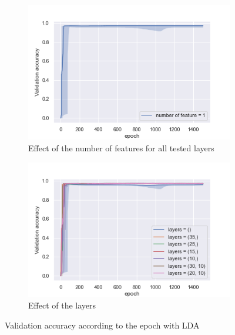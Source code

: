 \documentclass[twocolumn, 10pt]{article}
\begin{document}
			\begin{figure}[h]
				\centering
				\begin{subfigure}[t]{0.7\columnwidth}
					\centering
					\includegraphics[width=\linewidth]{../graphics/LDA_epoch_val_categorical_accuracy_number_of_feature.png}
					\caption{Effect of the number of features for all tested layers}
					\label{fig:per_lda_nf}
				\end{subfigure}
				\begin{subfigure}[t]{0.7\columnwidth}
					\centering
					\includegraphics[width=\linewidth]{../graphics/LDA_epoch_val_categorical_accuracy_layers.png}
					\caption{Effect of the layers}
					\label{fig:per_lda_nf_3525}
				\end{subfigure}
				\caption{Validation accuracy according to the epoch with LDA}
				\label{fig:per_lda}
			\end{figure}
\end{document}
